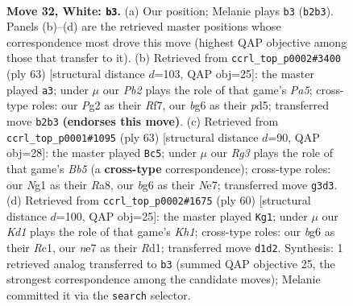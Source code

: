 \documentclass[11pt]{article}
\begin{document}
\clearpage

\begin{figure}[p]\centering
\begin{subfigure}{0.46\textwidth}\centering
\resizebox{\linewidth}{!}{%
\newchessgame
\chessboard[
  setfen={1r3b2/2nkn1pr/6b1/7p/p1B1pP1P/P5R1/1P4P1/R2K2NN w - - 24 32},
  showmover=false,
  pgfstyle=straightmove, color=movearrow, markmove={b2-b3}
]}
\caption{}
\end{subfigure}\hfill
\begin{subfigure}{0.46\textwidth}\centering
\resizebox{\linewidth}{!}{%
\newchessgame
\chessboard[
  setfen={r5k1/5r1p/3n4/3P4/p1b3p1/1p4N1/1P1R1PPP/R3B1K1 b - - 0 32},
  showmover=false,
  pgfstyle=straightmove, color=movearrow, markmove={a4-a3}
]}
\caption{}
\end{subfigure}
\\[4pt]
\begin{subfigure}{0.46\textwidth}\centering
\resizebox{\linewidth}{!}{%
\newchessgame
\chessboard[
  setfen={r1r5/3pnk1p/pB3p2/P2p2p1/1b1N2P1/1P2R3/1P3P1P/3R2K1 b - - 0 32},
  showmover=false,
  pgfstyle=straightmove, color=movearrow, markmove={b4-c5}
]}
\caption{}
\end{subfigure}\hfill
\begin{subfigure}{0.46\textwidth}\centering
\resizebox{\linewidth}{!}{%
\newchessgame
\chessboard[
  setfen={1rr1n1k1/p6p/3p4/Bb1Pbp2/3p4/1P3P1N/P5PP/2RR1N1K w - - 0 31},
  showmover=false,
  pgfstyle=straightmove, color=movearrow, markmove={h1-g1}
]}
\caption{}
\end{subfigure}
\caption{\textbf{Move 32, White: \texttt{b3}.} (a) Our position; Melanie plays \texttt{b3} (\texttt{b2b3}). Panels (b)--(d) are the retrieved master positions whose correspondence most drove this move (highest QAP objective among those that transfer to it). (b) Retrieved from \texttt{ccrl\_top\_p0002\#3400} (ply 63) [structural distance $d$=103, QAP obj=25]: the master played \texttt{a3}; under $\mu$ our \emph{Pb2} plays the role of that game's \emph{Pa5}; cross-type roles: our \emph{P}g2 as their \emph{R}f7, our \emph{b}g6 as their \emph{p}d5; transferred move \texttt{b2b3} \textbf{(endorses this move)}. (c) Retrieved from \texttt{ccrl\_top\_p0001\#1095} (ply 63) [structural distance $d$=90, QAP obj=28]: the master played \texttt{Bc5}; under $\mu$ our \emph{Rg3} plays the role of that game's \emph{Bb5} (a \textbf{cross-type} correspondence); cross-type roles: our \emph{N}g1 as their \emph{R}a8, our \emph{b}g6 as their \emph{N}e7; transferred move \texttt{g3d3}. (d) Retrieved from \texttt{ccrl\_top\_p0002\#1675} (ply 60) [structural distance $d$=100, QAP obj=25]: the master played \texttt{Kg1}; under $\mu$ our \emph{Kd1} plays the role of that game's \emph{Kh1}; cross-type roles: our \emph{b}g6 as their \emph{R}c1, our \emph{n}e7 as their \emph{R}d1; transferred move \texttt{d1d2}. Synthesis: 1 retrieved analog transferred to \texttt{b3} (summed QAP objective 25, the strongest correspondence among the candidate moves); Melanie committed it via the \texttt{search} selector.}
\label{fig:thought-m62}
\end{figure}
\end{document}
